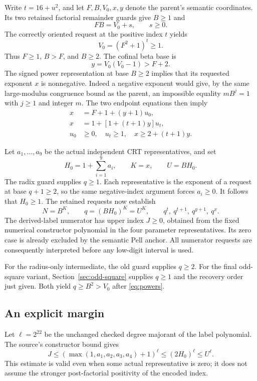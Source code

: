 \documentclass[11pt]{article}
\theoremstyle{remark}
\numberwithin{equation}{section}
\begin{document}
Write $t=16+u^2$, and let $F,B,V_0,x,y$ denote the parent's semantic coordinates. Its two retained factorial remainder guards give $B\ge1$ and
\begin{equation}\label{eq:ceil}
FB=V_0+s,\qquad s\ge0.
\end{equation}
The correctly oriented request at the positive index $t$ yields
\[
V_0=(F^2+1)^t\ge1.
\]
Thus $F\ge1$, $B>F$, and $B\ge2$. The cofinal beta base is
\[
y=V_0(V_0-1)>F+2.
\]
The signed power representation at base $B\ge2$ implies that its requested exponent $x$ is nonnegative. Indeed a negative exponent would give, by the same large-modulus congruence bound as the parent, an impossible equality $mB^j=1$ with $j\ge1$ and integer $m$. The two endpoint equations then imply
\begin{align}
x&=F+1+(y+1)u_0,\\
x&=1+[1+(t+1)y]u_t,\\
u_0&\ge0,\quad u_t\ge1,\quad x\ge2+(t+1)y.\label{eq:xlower}
\end{align}

Let $a_1,\ldots,a_9$ be the actual independent CRT representatives, and set
\[
H_0=1+\sum_{i=1}^9 a_i,\qquad K=x,\qquad U=BH_0.
\]
The radix guard supplies $q\ge1$. Each representative is the exponent of a request at base $q+1\ge2$, so the same negative-index argument forces $a_i\ge0$. It follows that $H_0\ge1$. The retained requests now establish
\begin{equation}\label{eq:powers}
N=B^K,\qquad q=(BH_0)^K=U^K,
\qquad q^t,\ q^{t+1},\ q^{y+1},\ q^x.
\end{equation}
The derived-label numerator has upper index $J\ge0$, obtained from the fixed numerical constructor polynomial in the four parameter representatives. Its zero case is already excluded by the semantic Pell anchor. All numerator requests are consequently interpreted before any low-digit interval is used.

For the radius-only intermediate, the old guard supplies $q\ge2$. For the final odd-square variant, Section~\ref{sec:odd-square} supplies $q\ge1$ and the recovery order just given. Both yield $q\ge B^2>V_0$ after \eqref{eq:powers}.

\subsection{An explicit margin}

Let $\ell=2^{22}$ be the unchanged checked degree majorant of the label polynomial. The source's constructor bound gives
\begin{equation}\label{eq:jbound}
J\le(\max(1,a_1,a_2,a_3,a_4)+1)^\ell\le(2H_0)^\ell\le U^\ell.
\end{equation}
This estimate is valid even when some actual representative is zero; it does not assume the stronger post-factorial positivity of the encoded index.
\end{document}

